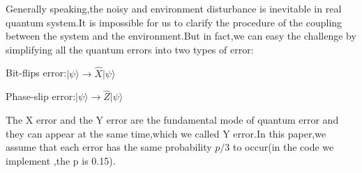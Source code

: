 \documentclass[
	a4paper, %
	10pt, %
	unnumberedsections, %
	twoside, %
]{LTJournalArticle}
\begin{document}
Generally speaking,the noisy and environment disturbance is inevitable in real quantum system.It is impossible for us to clarify the procedure of the coupling between the system and the environment.But in fact,we can easy the challenge by simplifying all the quantum errors into two types of error:
\begin{center}
Bit-flips error:$\vert \psi \rangle \rightarrow \hat{X} \vert \psi \rangle$
\end{center}
\begin{center}
Phase-slip error:$\vert \psi \rangle \rightarrow \hat{Z} \vert \psi \rangle$
\end{center}
The X error and the Y error are the fundamental mode of quantum error and they can appear at the same time,which we called Y error.In this paper,we assume that each error has the same probability $p/3$ to occur(in the code we implement ,the p is 0.15).
\end{document}
